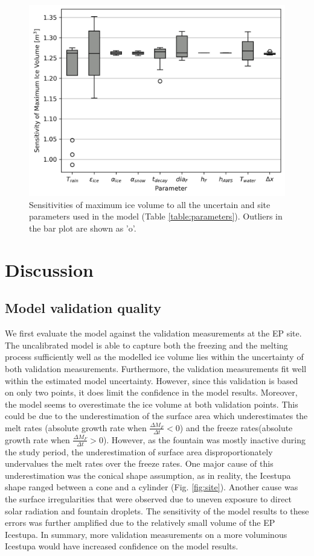 \documentclass[utf8]{frontiersSCNS} %
\begin{document}
\begin{figure} \begin{center} \includegraphics[width=10 cm]{Figures/Figure_9.jpg} \end{center}
\caption{Sensitivities of maximum ice volume to all the uncertain and site parameters used in the model (Table
\ref{table:parameters}).  Outliers in the bar plot are shown as 'o'.} \label{fig:sensitivity} \end{figure}
\section{Discussion}

\subsection{Model validation quality}

We first evaluate the model against the validation measurements at the EP site. The uncalibrated model is able
to capture both the freezing and the melting process sufficiently well as the modelled ice volume lies within the
uncertainty of both validation measurements. Furthermore, the validation measurements fit well within the estimated
model uncertainty.  However, since this validation is based on only two points, it does limit the confidence in the
model results. Moreover, the model seems to overestimate the ice volume at both validation points. This could be due
to the underestimation of the surface area which underestimates the melt rates (absolute growth rate when
$\frac{\Delta M_{F}}{\Delta t} < 0$) and the freeze rates(absolute growth rate when $\frac{\Delta M_{F}}{\Delta t} >
0$). However, as the fountain was mostly inactive during the study period, the underestimation of surface area
disproportionately undervalues the melt rates over the freeze rates. One major cause of this underestimation was the
conical shape assumption, as in reality, the Icestupa shape ranged between a cone and a cylinder (Fig.
\ref{fig:site}).  Another cause was the surface irregularities that were observed due to uneven exposure to direct
solar radiation and fountain droplets. The sensitivity of the model results to these errors was further amplified due
to the relatively small volume of the EP Icestupa. In summary, more validation measurements on a more
voluminous Icestupa would have increased confidence on the model results.
\end{document}
